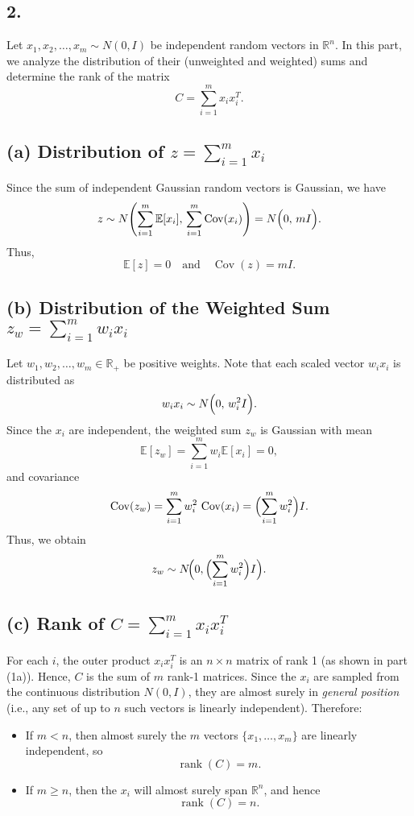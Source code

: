 \subsection*{2.}

Let $x_1, x_2, \dots, x_m \sim N(0,I)$ be independent random vectors in $\mathbb{R}^n$. In this part, we analyze the distribution of their (unweighted and weighted) sums and determine the rank of the matrix
\[
C = \sum_{i=1}^m x_i x_i^T.
\]

\subsection*{(a) Distribution of $z = \sum_{i=1}^m x_i$}
Since the sum of independent Gaussian random vectors is Gaussian, we have
\[
z \sim N\Biggl(\sum_{i=1}^m \mathbb{E}[x_i],\, \sum_{i=1}^m \operatorname{Cov}(x_i)\Biggr)
= N\Bigl(0,\, mI\Bigr).
\]
Thus, 
\[
\mathbb{E}[z] = 0 \quad \text{and} \quad \operatorname{Cov}(z) = mI.
\]

\subsection*{(b) Distribution of the Weighted Sum $z_w = \sum_{i=1}^m w_i x_i$}
Let $w_1, w_2, \dots, w_m \in \mathbb{R}_+$ be positive weights. Note that each scaled vector $w_i x_i$ is distributed as
\[
w_i x_i \sim N\Bigl(0,\, w_i^2 I\Bigr).
\]
Since the $x_i$ are independent, the weighted sum $z_w$ is Gaussian with mean
\[
\mathbb{E}[z_w] = \sum_{i=1}^m w_i \mathbb{E}[x_i] = 0,
\]
and covariance
\[
\operatorname{Cov}(z_w) = \sum_{i=1}^m w_i^2\, \operatorname{Cov}(x_i)
= \Bigl(\sum_{i=1}^m w_i^2\Bigr) I.
\]
Thus, we obtain
\[
z_w \sim N\!\Bigl(0, \Bigl(\sum_{i=1}^m w_i^2\Bigr) I\Bigr).
\]

\subsection*{(c) Rank of $C = \sum_{i=1}^m x_i x_i^T$}
For each $i$, the outer product $x_i x_i^T$ is an $n\times n$ matrix of rank 1 (as shown in part (1a)). Hence, $C$ is the sum of $m$ rank-1 matrices. Since the $x_i$ are sampled from the continuous distribution $N(0,I)$, they are almost surely in \emph{general position} (i.e., any set of up to $n$ such vectors is linearly independent). Therefore:
\begin{itemize}
    \item If $m < n$, then almost surely the $m$ vectors $\{x_1, \dots, x_m\}$ are linearly independent, so
    \[
    \operatorname{rank}(C)=m.
    \]
    \item If $m \ge n$, then the $x_i$ will almost surely span $\mathbb{R}^n$, and hence
    \[
    \operatorname{rank}(C)=n.
    \]
\end{itemize}

